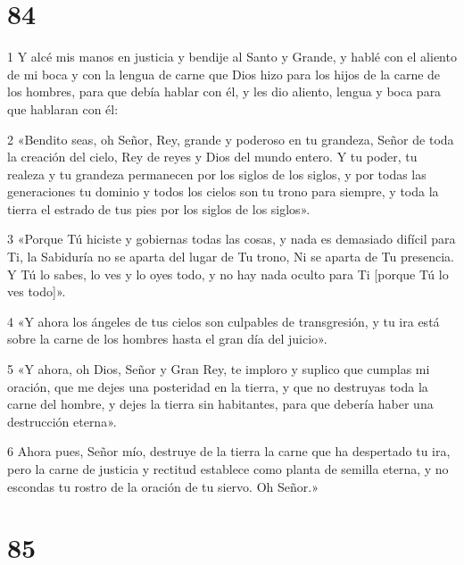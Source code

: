 \chapter{84}

\par 1 Y alcé mis manos en justicia y bendije al Santo y Grande, y hablé con el aliento de mi boca y con la lengua de carne que Dios hizo para los hijos de la carne de los hombres, para que debía hablar con él, y les dio aliento, lengua y boca para que hablaran con él:
\par 2 «Bendito seas, oh Señor, Rey, grande y poderoso en tu grandeza, Señor de toda la creación del cielo, Rey de reyes y Dios del mundo entero. Y tu poder, tu realeza y tu grandeza permanecen por los siglos de los siglos, y por todas las generaciones tu dominio y todos los cielos son tu trono para siempre, y toda la tierra el estrado de tus pies por los siglos de los siglos».
\par 3 «Porque Tú hiciste y gobiernas todas las cosas, y nada es demasiado difícil para Ti, la Sabiduría no se aparta del lugar de Tu trono, Ni se aparta de Tu presencia. Y Tú lo sabes, lo ves y lo oyes todo, y no hay nada oculto para Ti [porque Tú lo ves todo]».
\par 4 «Y ahora los ángeles de tus cielos son culpables de transgresión, y tu ira está sobre la carne de los hombres hasta el gran día del juicio».
\par 5 «Y ahora, oh Dios, Señor y Gran Rey, te imploro y suplico que cumplas mi oración, que me dejes una posteridad en la tierra, y que no destruyas toda la carne del hombre, y dejes la tierra sin habitantes, para que debería haber una destrucción eterna».
\par 6 Ahora pues, Señor mío, destruye de la tierra la carne que ha despertado tu ira, pero la carne de justicia y rectitud establece como planta de semilla eterna, y no escondas tu rostro de la oración de tu siervo. Oh Señor.»

\chapter{85}

